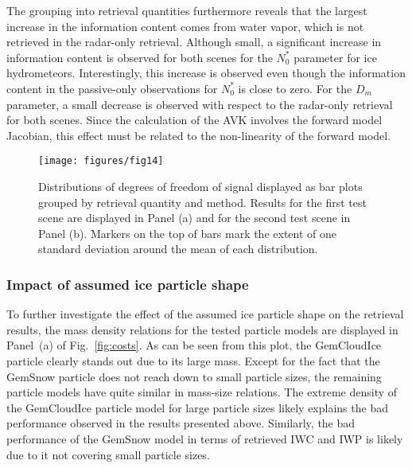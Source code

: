 \documentclass[journal abbreviation, manuscript]{copernicus}
\begin{document}
The grouping into retrieval quantities furthermore reveals that the largest
increase in the information content comes from water vapor, which is not
retrieved in the radar-only retrieval. Although small, a significant increase in
information content is observed for both scenes for the $N_0^*$ parameter for
ice hydrometeors. Interestingly, this increase is observed even though the
information content in the passive-only observations for $N_0^*$ is close to
zero. For the $D_m$ parameter, a small decrease is observed with respect to the
radar-only retrieval for both scenes. Since the calculation of the AVK involves
the forward model Jacobian, this effect must be related to the non-linearity of
the forward model.

\begin{figure}
\centering
\texttt{[image: figures/fig14]}
\caption{Distributions of degrees of freedom of signal displayed as bar plots
  grouped by retrieval quantity and method. Results for the first test scene are
  displayed in Panel (a) and for the second test scene in Panel (b). Markers on
  the top of bars mark the extent of one standard deviation around the mean of
  each distribution.}
\label{fig:dofs}
\end{figure}

\subsubsection{Impact of assumed ice particle shape}



To further investigate the effect of the assumed ice particle shape on the
retrieval results, the mass density relations for the tested particle models are
displayed in Panel~(a) of Fig.~\ref{fig:costs}. As can be seen from this plot,
the GemCloudIce particle clearly stands out due to its large mass. Except for
the fact that the GemSnow particle does not reach down to small particle sizes,
the remaining particle models have quite similar in mass-size relations. The
extreme density of the GemCloudIce particle model for large particle sizes likely
explains the bad performance observed in the results presented above. Similarly,
the bad performance of the GemSnow model in terms of retrieved IWC and IWP is likely
due to it not covering small particle sizes.
\end{document}
